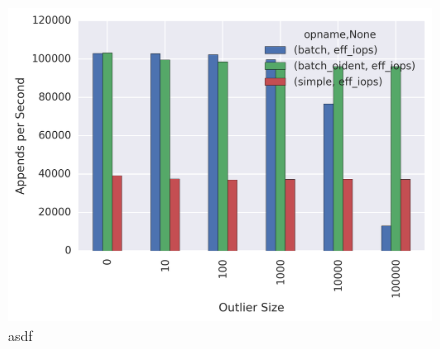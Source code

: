 \begin{figure}[t]
\centering
\includegraphics[width=1.0\linewidth]{batching-outlier-detect.png}
\caption{asdf}
\label{fig:jewel-hdd-128b}
\end{figure}
